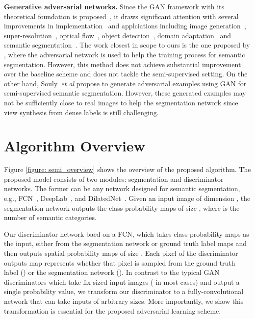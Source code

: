 \documentclass{bmvc2k}
\def\etal{\emph{et al}\bmvaOneDot}
\begin{document}
	{\flushleft \bf Generative adversarial networks.}
Since the GAN framework with its theoretical foundation is proposed~\cite{gan}, it draws significant attention with several improvements in implementation~\cite{dcgan,denton2015deep, arjovsky2017wasserstein, mao2016multi, berthelot2017began} and applciations
including image generation~\cite{dcgan}, super-resolution~\cite{srgan,lai2017deep}, optical flow~\cite{lai2017semi}, object detection~\cite{fastarcnn}, domain adaptation~\cite{fcnsinthewild,Tsai_adaptseg_2018,Hoffman_cycada2017} and semantic segmentation~\cite{luc2016semantic, souly2017semi}.
The work closest in scope to ours is the one proposed by \cite{luc2016semantic}, where the adversarial network is used to help the training process for semantic segmentation. 
However, this method does not achieve substantial improvement over the baseline scheme 
	and does not tackle the semi-supervised setting.
On the other hand, Souly~\etal \cite{souly2017semi} propose to generate adversarial examples using GAN for semi-supervised semantic segmentation. 
However, these generated examples may not be sufficiently close to real images to help the segmentation network since view synthesis from dense labels is still challenging.


	\vspace{-2mm}
	\section{Algorithm Overview}
	\vspace{-2mm}


	Figure \ref{figure: semi_overview} shows the overview of the proposed algorithm.
The proposed model consists of two modules: segmentation and discriminator networks.
The former can be any network designed for semantic segmentation, e.g., FCN~\cite{fcn}, DeepLab~\cite{deeplab}, and DilatedNet~\cite{dilated}.
Given an input image of dimension , the segmentation network outputs the class probability maps of size , where  is the number of semantic categories.


	Our discriminator network baed on a FCN, which takes class probability maps as the input, either from the segmentation network or ground truth label maps and then outputs spatial probability maps of size .
Each pixel  of the discriminator outputs map represents whether that pixel is sampled from the ground truth label () or the segmentation network ().
In contrast to the typical GAN discriminators which take fix-sized input images ( in most cases) and output a single probability value, we transform our discriminator to a fully-convolutional network that can take inputs of arbitrary sizes.
More importantly, we show this transformation is essential for the proposed adversarial learning scheme.
	
\end{document}

